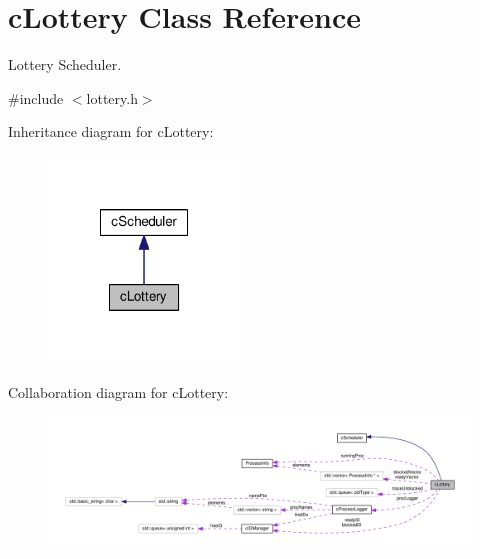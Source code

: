 \hypertarget{classcLottery}{\section{c\-Lottery \-Class \-Reference}
\label{dd/dc8/classcLottery}
}


\-Lottery \-Scheduler.  




{\ttfamily \#include $<$lottery.\-h$>$}



\-Inheritance diagram for c\-Lottery\-:\nopagebreak
\begin{figure}[H]
\begin{center}
\leavevmode
\includegraphics[width=144pt]{dd/df5/classcLottery__inherit__graph}
\end{center}
\end{figure}


\-Collaboration diagram for c\-Lottery\-:\nopagebreak
\begin{figure}[H]
\begin{center}
\leavevmode
\includegraphics[width=350pt]{d0/ded/classcLottery__coll__graph}
\end{center}
\end{figure}

